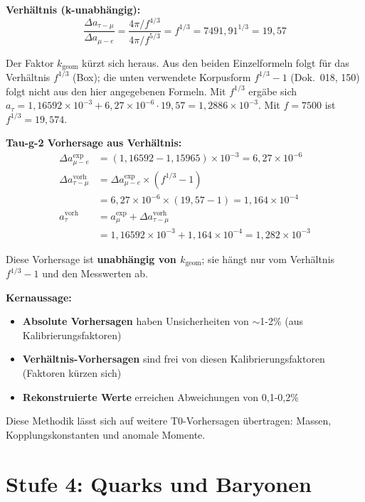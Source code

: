 	\textbf{Verhältnis (k-unabhängig):}
	\begin{equation}
		\boxed{\frac{\Delta a_{\tau-\mu}}{\Delta a_{\mu-e}} = \frac{4\pi/f^{4/3}}{4\pi/f^{5/3}} = f^{1/3} = 7491{,}91^{1/3} = 19{,}57}
	\end{equation}
	
	Der Faktor \(k_{\text{geom}}\) kürzt sich heraus.
	Aus den beiden Einzelformeln folgt für das Verhältnis $f^{1/3}$ (Box); die unten verwendete Korpusform $f^{1/3}-1$ (Dok.~018, 150) folgt nicht aus den hier angegebenen Formeln. Mit $f^{1/3}$ ergäbe sich $a_\tau = 1{,}16592\times10^{-3} + 6{,}27\times10^{-6}\cdot19{,}57 = 1{,}2886\times10^{-3}$. Mit $f = 7500$ ist $f^{1/3} = 19{,}574$.
	
	\textbf{Tau-g-2 Vorhersage aus Verhältnis:}
	\begin{align}
		\Delta a_{\mu-e}^{\exp} &= (1{,}16592 - 1{,}15965) \times 10^{-3} = 6{,}27 \times 10^{-6} \\
		\Delta a_{\tau-\mu}^{\text{vorh}} &= \Delta a_{\mu-e}^{\exp} \times (f^{1/3} - 1) \\
		&= 6{,}27 \times 10^{-6} \times (19{,}57 - 1) = 1{,}164 \times 10^{-4} \\
		a_\tau^{\text{vorh}} &= a_\mu^{\exp} + \Delta a_{\tau-\mu}^{\text{vorh}} \\
		&= 1{,}16592 \times 10^{-3} + 1{,}164 \times 10^{-4} = 1{,}282 \times 10^{-3}
	\end{align}
	
	Diese Vorhersage ist \textbf{unabhängig von \(k_{\text{geom}}\)}; sie hängt nur vom Verhältnis \(f^{1/3}-1\) und den Messwerten ab.
	
	\textbf{Kernaussage:}
	
	\begin{itemize}
		\item \textbf{Absolute Vorhersagen} haben Unsicherheiten von \(\sim\)1-2\% (aus Kalibrierungsfaktoren)
		\item \textbf{Verhältnis-Vorhersagen} sind frei von diesen Kalibrierungsfaktoren (Faktoren kürzen sich)
		\item \textbf{Rekonstruierte Werte} erreichen Abweichungen von 0{,}1-0{,}2\%
	\end{itemize}
	
	Diese Methodik lässt sich auf weitere T0-Vorhersagen übertragen: Massen, Kopplungskonstanten und anomale Momente.
	
	\section{Stufe 4: Quarks und Baryonen}
	
